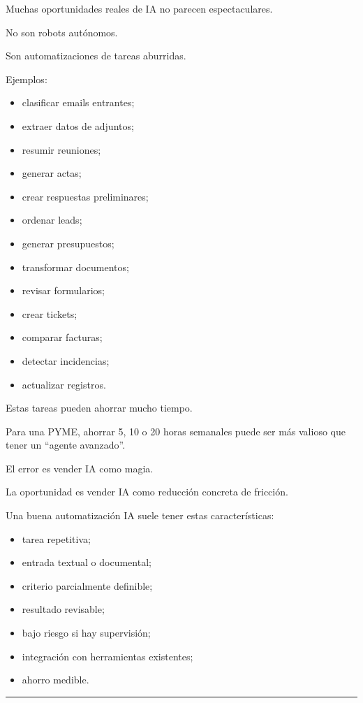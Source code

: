 Muchas oportunidades reales de IA no parecen espectaculares.

No son robots autónomos.

Son automatizaciones de tareas aburridas.

Ejemplos:

\begin{itemize}
\tightlist
\item
  clasificar emails entrantes;
\item
  extraer datos de adjuntos;
\item
  resumir reuniones;
\item
  generar actas;
\item
  crear respuestas preliminares;
\item
  ordenar leads;
\item
  generar presupuestos;
\item
  transformar documentos;
\item
  revisar formularios;
\item
  crear tickets;
\item
  comparar facturas;
\item
  detectar incidencias;
\item
  actualizar registros.
\end{itemize}

Estas tareas pueden ahorrar mucho tiempo.

Para una PYME, ahorrar 5, 10 o 20 horas semanales puede ser más valioso
que tener un ``agente avanzado''.

El error es vender IA como magia.

La oportunidad es vender IA como reducción concreta de fricción.

Una buena automatización IA suele tener estas características:

\begin{itemize}
\tightlist
\item
  tarea repetitiva;
\item
  entrada textual o documental;
\item
  criterio parcialmente definible;
\item
  resultado revisable;
\item
  bajo riesgo si hay supervisión;
\item
  integración con herramientas existentes;
\item
  ahorro medible.
\end{itemize}

\begin{center}\rule{0.5\linewidth}{0.5pt}\end{center}


